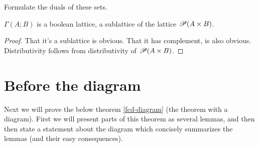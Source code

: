 \begin{xca}
Formulate the duals of these sets.\end{xca}
\begin{prop}
$\Gamma(A;B)$ is a boolean lattice, a sublattice of the lattice $\mathscr{P}(A\times B)$.\end{prop}
\begin{proof}
That it's a sublattice is obvious. That it has complement, is also
obvious. Distributivity follows from distributivity of $\mathscr{P}(A\times B)$.
\end{proof}

\section{Before the diagram}

Next we will prove the below theorem \ref{fcd-diagram} (the theorem
with a diagram). First we will present parts of this theorem as several
lemmas, and then then state a statement about the diagram which concisely
summarizes the lemmas (and their easy consequences).

